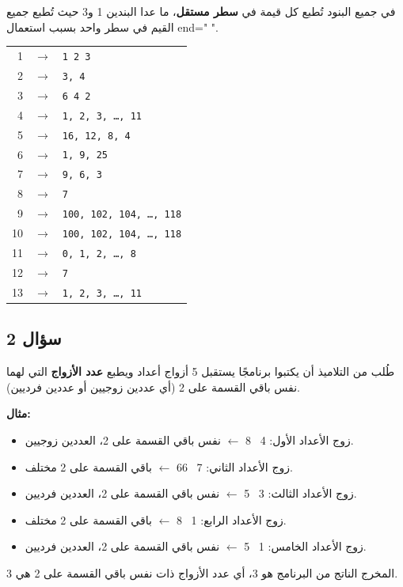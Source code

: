 \documentclass[14pt]{extarticle}
\begin{document}
\ifwithsols
\begin{boxSolution}
في جميع البنود تُطبع كل قيمة في \textbf{سطر مستقل}، ما عدا البندين 1 و3 حيث تُطبع جميع القيم في سطر واحد بسبب استعمال \textenglish{end=" "}.

\begin{english}
\renewcommand{\arraystretch}{1.2}
\begin{tabular}{rcl}
1 & $\rightarrow$ & \texttt{1 2 3} \\
2 & $\rightarrow$ & \texttt{3, 4} \\
3 & $\rightarrow$ & \texttt{6 4 2} \\
4 & $\rightarrow$ & \texttt{1, 2, 3, \ldots, 11} \\
5 & $\rightarrow$ & \texttt{16, 12, 8, 4} \\
6 & $\rightarrow$ & \texttt{1, 9, 25} \\
7 & $\rightarrow$ & \texttt{9, 6, 3} \\
8 & $\rightarrow$ & \texttt{7} \\
9 & $\rightarrow$ & \texttt{100, 102, 104, \ldots, 118} \\
10 & $\rightarrow$ & \texttt{100, 102, 104, \ldots, 118} \\
11 & $\rightarrow$ & \texttt{0, 1, 2, \ldots, 8} \\
12 & $\rightarrow$ & \texttt{7} \\
13 & $\rightarrow$ & \texttt{1, 2, 3, \ldots, 11} \\
\end{tabular}
\end{english}
\end{boxSolution}
\fi

\clearpage
\subsection*{سؤال 2}
طُلب من التلاميذ أن يكتبوا برنامجًا يستقبل 5 أزواج أعداد ويطبع \textbf{عدد الأزواج} التي لهما نفس باقي القسمة على 2 (أي عددين زوجيين أو عددين فرديين).

\textbf{مثال:}
\begin{itemize}
    \item زوج الأعداد الأول: \textenglish{4 \ 8} $\leftarrow$ نفس باقي القسمة على 2، العددين زوجيين.
    \item زوج الأعداد الثاني: \textenglish{7 \ 66} $\leftarrow$ باقي القسمة على 2 مختلف.
    \item زوج الأعداد الثالث: \textenglish{3 \ 5} $\leftarrow$ نفس باقي القسمة على 2، العددين فرديين.
    \item زوج الأعداد الرابع: \textenglish{1 \ 8} $\leftarrow$ باقي القسمة على 2 مختلف.
    \item زوج الأعداد الخامس: \textenglish{1 \ 5} $\leftarrow$ نفس باقي القسمة على 2، العددين فرديين.
\end{itemize}
المخرج الناتج من البرنامج هو \textenglish{3}، أي عدد الأزواج ذات نفس باقي القسمة على 2 هي \textenglish{3}.
\end{document}
